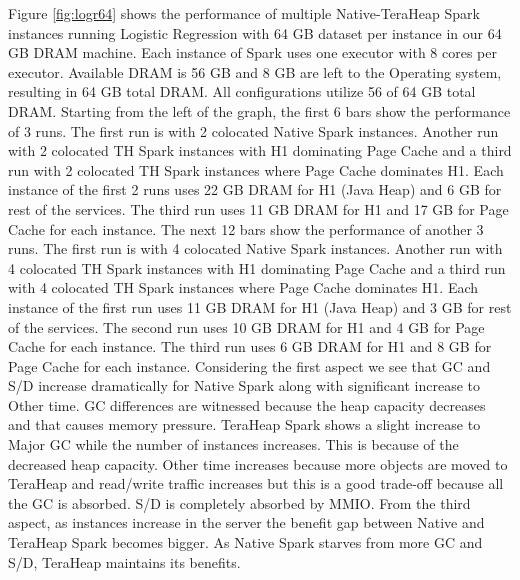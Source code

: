 Figure \ref{fig:logr64} shows the performance of multiple
Native-TeraHeap Spark instances running Logistic Regression with 64 GB
dataset per instance in our 64 GB DRAM machine. Each instance of Spark
uses one executor with 8 cores per executor. Available DRAM is 56 GB
and 8 GB are left to the Operating system, resulting in 64 GB total
DRAM. All configurations utilize 56 of 64 GB total DRAM.
Starting from the left of the graph, the first 6 bars show the
performance of 3 runs. The first run is with 2 colocated Native Spark instances.
Another run with 2 colocated TH Spark instances with H1 dominating Page Cache
and a third run with 2 colocated TH Spark instances where Page Cache dominates H1.
Each instance of the first 2 runs uses 22 GB DRAM for H1 (Java Heap) and 6 GB for rest of the services.
The third run uses 11 GB DRAM for H1 and 17 GB for Page Cache for each instance. 
The next 12 bars show the performance of another 3 runs. The first run is with 4 colocated Native Spark instances.
Another run with 4 colocated TH Spark instances with H1 dominating Page Cache
and a third run with 4 colocated TH Spark instances where Page Cache dominates H1.
Each instance of the first run uses 11 GB DRAM for H1 (Java Heap) and 3 GB for rest of the services.
The second run uses 10 GB DRAM for H1 and 4 GB for Page Cache for each instance.
The third run uses 6 GB DRAM for H1 and 8 GB for Page Cache for each instance.
Considering the first aspect we see that GC and S/D increase dramatically for Native Spark along with significant increase to Other time. GC differences are witnessed because the heap capacity decreases and that causes memory pressure. TeraHeap Spark shows a slight increase to Major GC while the number of instances increases. This is because of the decreased heap capacity. Other time increases because more objects are moved to TeraHeap and read/write traffic increases but this is a good trade-off because all the GC is absorbed. S/D is completely absorbed by MMIO. From the third aspect, as instances increase in the server the benefit gap between Native and TeraHeap Spark becomes bigger. As Native Spark starves from more GC and S/D, TeraHeap maintains its benefits. 

